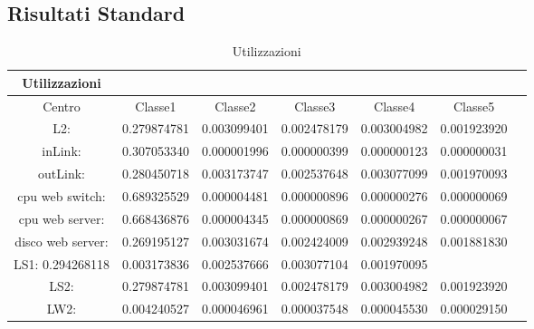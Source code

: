 \subsection{Risultati Standard}
\begin{table}[htbp]
\begin{center}
\begin{tabular}{||c|c|c|c|c|c|c||}
\hline
Utilizzazioni\\
\hline
Centro &Classe1 &Classe2 &Classe3 &Classe4 &Classe5\\
\hline
\hline
L2: &0.279874781 &0.003099401 &0.002478179 &0.003004982 &0.001923920\\
\hline
inLink: &0.307053340 &0.000001996 &0.000000399 &0.000000123 &0.000000031\\
\hline
outLink: &0.280450718 &0.003173747 &0.002537648 &0.003077099 &0.001970093\\
\hline
cpu web switch: &0.689325529 &0.000004481 &0.000000896 &0.000000276 &0.000000069\\
\hline
cpu web server: &0.668436876 &0.000004345 &0.000000869 &0.000000267 &0.000000067\\
\hline
disco web server: &0.269195127 &0.003031674 &0.002424009 &0.002939248 &0.001881830\\
\hline
LS1: 0.294268118 &0.003173836 &0.002537666 &0.003077104 &0.001970095\\
\hline
LS2: &0.279874781 &0.003099401 &0.002478179 &0.003004982 &0.001923920\\
\hline
LW2: &0.004240527 &0.000046961 &0.000037548 &0.000045530 &0.000029150\\
\hline
\end{tabular}
\end{center}
\caption{Utilizzazioni}
\label{utilizzazioni}
\end{table}

